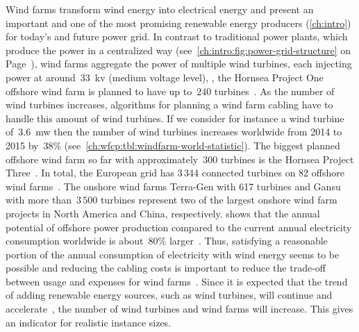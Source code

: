 Wind farms transform wind energy into electrical energy and present an important
and one of the most promising renewable energy producers (\cref{ch:intro}) for
today's and future power grid. In contrast to traditional power plants, which
produce the power in a centralized way
(see~\cref{ch:intro:fig:power-grid-structure} on
Page~\pageref{ch:intro:fig:power-grid-structure}), wind farms aggregate the
power of multiple wind turbines, each injecting power at around~$33$~\gls{kv}
(medium voltage level), \eg, the Hornsea Project One offshore wind farm is
planned to have up to~$240$ turbines~\parencite{online:hornsea-project-one}. As
the number of wind turbines increases, algorithms for planning a wind farm
cabling have to handle this amount of wind turbines. If we consider for instance
a wind turbine of~$3.6$~\gls{mw} then the number of wind turbines increases
worldwide from 2014 to 2015 by~$38$\%
(see~\cref{ch:wfcp:tbl:windfarm-world-statistic}). The biggest planned offshore
wind farm so far with approximately~$300$ turbines is the Hornsea Project
Three~\parencite{online:hornsea-project-three}. In total, the European grid has
3\,344 connected turbines on 82 offshore wind
farms~\parencite{online:wind-europe-key-trend-H1-2016}. The onshore wind farms
Terra-Gen with 617 turbines and Gansu with more than~$3\,500$ turbines represent
two of the largest onshore wind farm projects in North America and China,
respectively.
% 
 shows that the annual potential of
offshore power production compared to the current annual electricity consumption
worldwide is about~$80$\% larger~\parencite{969970}. Thus, satisfying a
reasonable portion of the annual consumption of electricity with wind energy
seems to be possible and reducing the cabling costs is important to reduce the
trade-off between usage and expenses for wind farms~\parencite{4523827}.
% 
Since it is expected that the trend of adding renewable energy sources, such as
wind turbines, will continue and accelerate~\parencite{online:eeg2014,
online:iwr-offshore-windindustrie-future-europe-data, 969970}, the number of
wind turbines and wind farms will increase. This gives an indicator for
realistic instance sizes.

